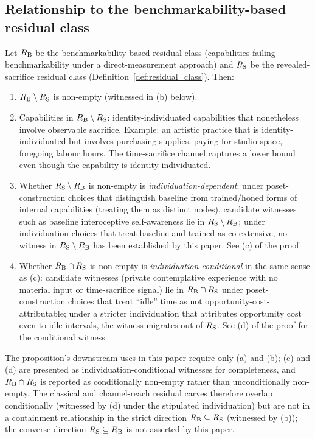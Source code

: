 \subsection{Relationship to the benchmarkability-based residual class}

\begin{proposition}
\label{prop:residual_intersection}
Let $R_{\mathrm{B}}$ be the benchmarkability-based residual class
(capabilities failing benchmarkability under a direct-measurement
approach) and $R_{\mathrm{S}}$ be the revealed-sacrifice residual class
(Definition~\ref{def:residual_class}).  Then:
\begin{enumerate}
\item[(a)] $R_{\mathrm{B}} \setminus R_{\mathrm{S}}$ is non-empty (witnessed in
  (b) below).
\item[(b)] Capabilities in $R_{\mathrm{B}} \setminus R_{\mathrm{S}}$:
  identity-individuated capabilities that nonetheless involve
  observable sacrifice.  Example: an artistic practice that is
  identity-individuated but involves purchasing supplies, paying
  for studio space, foregoing labour hours.  The time-sacrifice
  channel captures a lower bound even though the capability is
  identity-individuated.
\item[(c)] Whether $R_{\mathrm{S}} \setminus R_{\mathrm{B}}$ is non-empty is
  \emph{individuation-dependent}: under poset-construction
  choices that distinguish baseline from trained/honed forms
  of internal capabilities (treating them as distinct nodes),
  candidate witnesses such as baseline interoceptive
  self-awareness lie in $R_{\mathrm{S}} \setminus R_{\mathrm{B}}$; under
  individuation choices that treat baseline and trained as
  co-extensive, no witness in $R_{\mathrm{S}} \setminus R_{\mathrm{B}}$ has
  been established by this paper.  See (c) of the proof.
\item[(d)] Whether $R_{\mathrm{B}} \cap R_{\mathrm{S}}$ is non-empty is
  \emph{individuation-conditional} in the same sense as (c):
  candidate witnesses (private contemplative experience with no
  material input or time-sacrifice signal) lie in
  $R_{\mathrm{B}} \cap R_{\mathrm{S}}$ under poset-construction choices that
  treat ``idle'' time as not opportunity-cost-attributable;
  under a stricter individuation that attributes opportunity
  cost even to idle intervals, the witness migrates out of
  $R_{\mathrm{S}}$.  See (d) of the proof for the conditional witness.
\end{enumerate}
The proposition's downstream uses in this paper require only
(a) and (b); (c) and (d) are presented as
individuation-conditional witnesses for completeness, and
$R_{\mathrm{B}} \cap R_{\mathrm{S}}$ is reported as conditionally non-empty
rather than unconditionally non-empty.  The classical and
channel-reach residual carves therefore overlap conditionally
(witnessed by (d) under the stipulated individuation) but are
not in a containment relationship in the strict direction
$R_{\mathrm{B}} \subseteq R_{\mathrm{S}}$ (witnessed by (b)); the converse
direction $R_{\mathrm{S}} \subseteq R_{\mathrm{B}}$ is not asserted by this paper.
\end{proposition}

